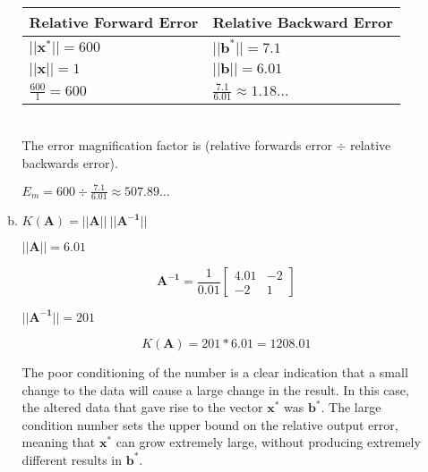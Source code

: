 \documentclass[11pt]{article}
\begin{document}
\begin{enumerate}
\begin{enumerate}[(a)]
			\begin{tabular}{ll}
				Relative Forward Error & Relative Backward Error \\
				\hline
				$||\mathbf{x^*}|| = 600$ & $||\mathbf{b^*}|| = 7.1$ \\

				$||\mathbf{x}|| = 1$ & $||\mathbf{b}|| = 6.01$ \\

				$\frac{600}{1} = 600$ & $\frac{7.1}{6.01} \approx 1.18\dots$ \\

			\end{tabular} \\

			The error magnification factor is (relative forwards error $\div$ relative backwards error).

			$E_m = 600 \div \frac{7.1}{6.01} \approx 507.89\dots$ \\

			\item $K(\mathbf{A}) = ||\mathbf{A}||\ ||\mathbf{A^{-1}}||$

			$||\mathbf{A}|| = 6.01$

			\[
				\mathbf{A^{-1}} =
				\frac{1}{0.01}
				\begin{bmatrix}
					4.01 & -2 \\
					-2 & 1
				\end{bmatrix}
			\]

			$||\mathbf{A^{-1}}|| = 201$

			$$K(\mathbf{A}) = 201*6.01 = 1208.01$$

			The poor conditioning of the number is a clear indication that a small change to the data will cause a large change in
			the result. In this case, the altered data that gave rise to the vector $\mathbf{x^*}$ was $\mathbf{b^*}$. The large
			condition number sets the upper bound on the relative output error, meaning that $\mathbf{x^*}$ can grow extremely
			large, without producing extremely different results in $\mathbf{b^*}$.

		\end{enumerate}


\end{enumerate}
\end{document}
